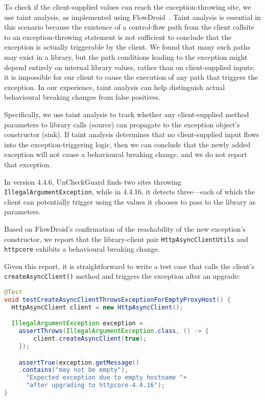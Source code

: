 To check if the client-supplied values can reach the exception-throwing site, we use taint analysis, as implemented using FlowDroid~\cite{Arzt14:_flowdroid}. Taint analysis is essential in this scenario because the existence of a control-flow path from the client callsite to an exception-throwing statement is not sufficient to conclude that the exception is actually triggerable by the client. We found that many such paths may exist in a library, but the path conditions leading to the exception might depend entirely on internal library values, rather than on client-supplied inputs; it is impossible for our client to cause the execution of any path that triggers the exception. In our experience, taint analysis can help distinguish actual behavioural breaking changes from false positives.

Specifically, we use taint analysis to track whether any client-supplied method parameters to library calls (source) can propagate to the exception object's constructor (sink). If taint analysis determines that no client-supplied input flows into the exception-triggering logic, then we can conclude that the newly added exception will not cause a behavioural breaking change, and we do not report that exception.

In version 4.4.6, UnCheckGuard finds two sites throwing \texttt{IllegalArgumentException}, while in 4.4.16, it detects three—each of which the client can potentially trigger using the values it chooses to pass to the library as parameters.

Based on FlowDroid's confirmation of the reachability of the new exception's constructor, we report that the library-client pair \texttt{HttpAsyncClientUtils} and \texttt{httpcore} exhibits a behavioural breaking change.

Given this report, it is straightforward to write a test case that calls the client's \texttt{createAsyncClient()} method
and triggers the exception after an upgrade:
\begin{lstlisting}[language=Java,basicstyle=\scriptsize\ttfamily]
@Test
void testCreateAsyncClientThrowsExceptionForEmptyProxyHost() {
  HttpAsyncClient client = new HttpAsyncClient();

  IllegalArgumentException exception =
    assertThrows(IllegalArgumentException.class, () -> {
        client.createAsyncClient(true);
    });

    assertTrue(exception.getMessage()
    .contains("may not be empty"),
      "Expected exception due to empty hostname "+
      "after upgrading to httpcore-4.4.16");
}
\end{lstlisting}
